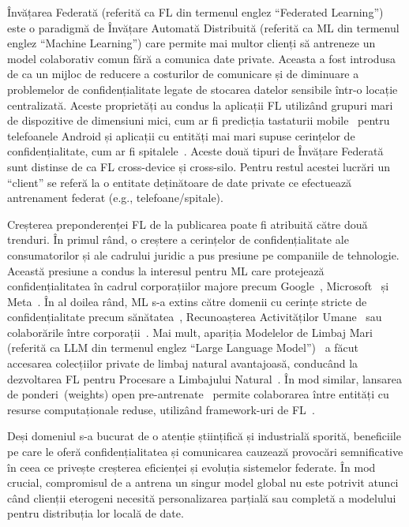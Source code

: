 Învățarea Federată (referită ca FL din termenul englez ``Federated Learning'') este o paradigmă de Învățare Automată Distribuită (referită ca ML din termenul englez ``Machine Learning'')  care permite mai multor clienți să antreneze un model colaborativ comun fără a comunica date private. Aceasta a fost introdusa de \citet{FedAvg} ca un mijloc de reducere a costurilor de comunicare și de diminuare a problemelor de confidențialitate legate de stocarea datelor sensibile într-o locație centralizată. Aceste proprietăți au condus la aplicații FL utilizând grupuri mari de dispozitive de dimensiuni mici, cum ar fi predicția tastaturii mobile~\citep{GoogleKeyboard} pentru telefoanele Android și aplicații cu entități mai mari supuse cerințelor de confidențialitate, cum ar fi spitalele~\citep{FLmedicine}. Aceste două tipuri de Învățare Federată sunt distinse de \citet{AdvancedAndOpenProblems} ca FL cross-device și cross-silo. Pentru restul acestei lucrări un ``client'' se referă la o entitate deținătoare de date private ce efectuează antrenament federat (e.g., telefoane/spitale).

Creșterea preponderenței FL de la publicarea \citet{FedAvg} poate fi atribuită către două trenduri. În primul rând, o creștere a cerințelor de confidențialitate ale consumatorilor și ale cadrului juridic a pus presiune pe companiile de tehnologie. Această presiune a condus la interesul pentru ML care protejează confidențialitatea în cadrul corporațiilor majore precum Google~\citep{FedAvg,GoogleKeyboard,ScaleSystemDesign}, Microsoft~\citep{FLINT} și  Meta~\citep{PAPAYA,FedBuff}. În al doilea rând, ML s-a extins către domenii cu cerințe stricte de confidențialitate precum sănătatea~\citep{FLmedicine}, Recunoașterea Activităților Umane~\citep{HARusingFL_2018,ClusterFL} sau colaborările între corporații~\citep{SustainableIncentive}. Mai mult, apariția Modelelor de Limbaj Mari (referită ca LLM din termenul englez ``Large Language Model'')~\citep{OpportunitiesAndRisksLLM} a făcut accesarea colecțiilor private de limbaj natural avantajoasă, conducând la dezvoltarea FL pentru Procesare a Limbajului Natural~\citep{FedNLP}. În mod similar, lansarea de ponderi~(weights) open pre-antrenate~\citep{LLaMA} permite colaborarea între entități cu resurse computaționale reduse, utilizând framework-uri de FL~\citep{Flower}.

Deși domeniul s-a bucurat de o atenție științifică și industrială sporită, beneficiile pe care le oferă confidențialitatea și comunicarea cauzează provocări semnificative în ceea ce privește creșterea eficienței și evoluția sistemelor federate. În mod crucial, compromisul de a antrena un singur model global nu este potrivit atunci când clienții eterogeni necesită personalizarea parțială sau completă a modelului pentru distribuția lor locală de date.


